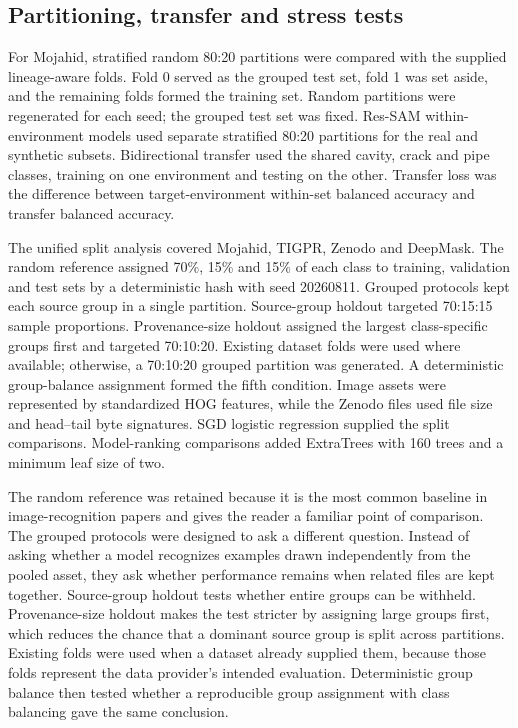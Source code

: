 \documentclass[]{interact}
\begin{document}
\subsection{Partitioning, transfer and stress tests}

For Mojahid, stratified random 80:20 partitions were compared with the supplied lineage-aware folds. Fold 0 served as the grouped test set, fold 1 was set aside, and the remaining folds formed the training set. Random partitions were regenerated for each seed; the grouped test set was fixed. Res-SAM within-environment models used separate stratified 80:20 partitions for the real and synthetic subsets. Bidirectional transfer used the shared cavity, crack and pipe classes, training on one environment and testing on the other. Transfer loss was the difference between target-environment within-set balanced accuracy and transfer balanced accuracy.

The unified split analysis covered Mojahid, TIGPR, Zenodo and DeepMask. The random reference assigned 70\%, 15\% and 15\% of each class to training, validation and test sets by a deterministic hash with seed 20260811. Grouped protocols kept each source group in a single partition. Source-group holdout targeted 70:15:15 sample proportions. Provenance-size holdout assigned the largest class-specific groups first and targeted 70:10:20. Existing dataset folds were used where available; otherwise, a 70:10:20 grouped partition was generated. A deterministic group-balance assignment formed the fifth condition. Image assets were represented by standardized HOG features, while the Zenodo files used file size and head--tail byte signatures. SGD logistic regression supplied the split comparisons. Model-ranking comparisons added ExtraTrees with 160 trees and a minimum leaf size of two.

The random reference was retained because it is the most common baseline in image-recognition papers and gives the reader a familiar point of comparison. The grouped protocols were designed to ask a different question. Instead of asking whether a model recognizes examples drawn independently from the pooled asset, they ask whether performance remains when related files are kept together. Source-group holdout tests whether entire groups can be withheld. Provenance-size holdout makes the test stricter by assigning large groups first, which reduces the chance that a dominant source group is split across partitions. Existing folds were used when a dataset already supplied them, because those folds represent the data provider's intended evaluation. Deterministic group balance then tested whether a reproducible group assignment with class balancing gave the same conclusion.
\end{document}
